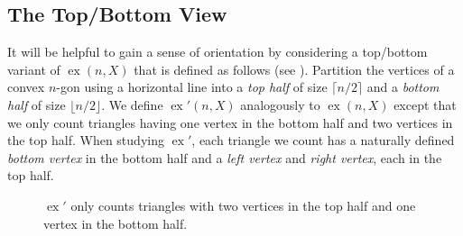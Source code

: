 \documentclass{patmorin}
\DeclareMathOperator{\ex}{ex}
\begin{document}
\subsection{The Top/Bottom View}

It will be helpful to gain a sense of orientation by considering
a top/bottom variant of $\ex(n,X)$ that is defined as follows (see
).  Partition the vertices of a convex $n$-gon using
a horizontal line into a \emph{top half} of size $\lceil n/2\rceil$
and a \emph{bottom half} of size $\lfloor n/2\rfloor$.  We define
$\ex'(n,X)$ analogously to $\ex(n,X)$ except that we only count triangles
having one vertex in the bottom half and two vertices in the top half.
When studying $\ex'$, each triangle we count has a naturally defined
\emph{bottom vertex} in the bottom half and a \emph{left vertex} and
\emph{right vertex}, each in the top half.

\begin{figure}
  \caption{$\ex'$ only counts triangles with two vertices in the top half
     and one vertex in the bottom half.}
\end{figure}
\end{document}

